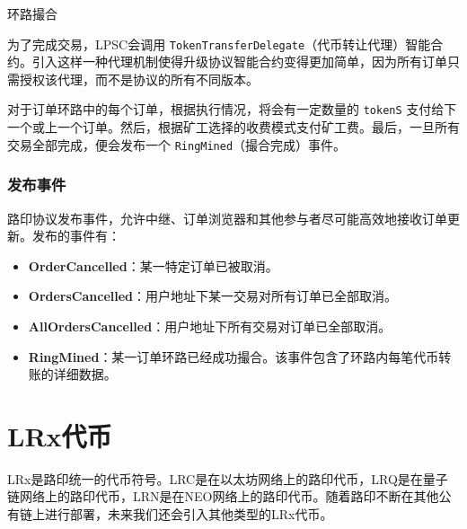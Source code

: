 \documentclass[UTF8]{ctexart}
\makeatletter
\newenvironment{figurehere}
 {\def\@captype{figure}}
 {}
\makeatother
\begin{document}
\begin{multicols}{2}
\begin{center}
\begin{figurehere}
\caption{环路撮合}
\label{fig:settlement}
\end{figurehere}
\end{center}

为了完成交易，LPSC会调用 \verb|TokenTransferDelegate|（代币转让代理）智能合约。引入这样一种代理机制使得升级协议智能合约变得更加简单，因为所有订单只需授权该代理，而不是协议的所有不同版本。

对于订单环路中的每个订单，根据执行情况，将会有一定数量的 \verb|tokenS| 支付给下一个或上一个订单。然后，根据矿工选择的收费模式支付矿工费。最后，一旦所有交易全部完成，便会发布一个 \verb|RingMined|（撮合完成）事件。

\subsubsection{发布事件\label{sec:events}}

路印协议发布事件，允许中继、订单浏览器和其他参与者尽可能高效地接收订单更新。发布的事件有：

\begin{itemize}
	\item \textbf{OrderCancelled}：某一特定订单已被取消。
	\item \textbf{OrdersCancelled}：用户地址下某一交易对所有订单已全部取消。
	\item \textbf{AllOrdersCancelled}：用户地址下所有交易对订单已全部取消。
	\item \textbf{RingMined}：某一订单环路已经成功撮合。该事件包含了环路内每笔代币转账的详细数据。
\end{itemize}


\section{LRx代币\label{sec:token}}
LRx是路印统一的代币符号。LRC是在以太坊网络上的路印代币，LRQ是在量子链网络上的路印代币，LRN是在NEO网络上的路印代币。随着路印不断在其他公有链上进行部署，未来我们还会引入其他类型的LRx代币。


\end{multicols}
\end{document}
